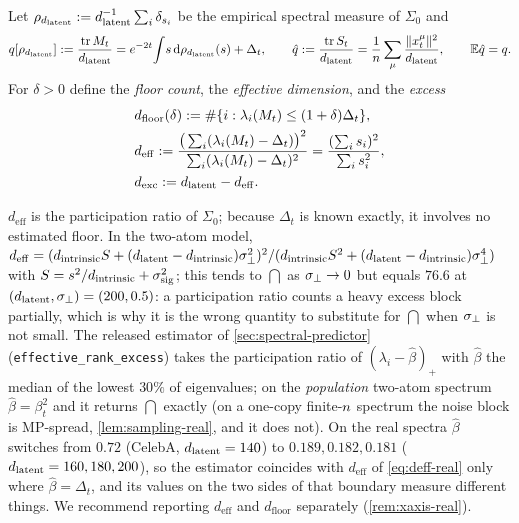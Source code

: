 \begin{definition}\label{def:deff-real}
Let $\rho_{d_{\mathrm{latent}}}:=d_{\mathrm{latent}}^{-1}\sum_i\delta_{s_i}$ be the empirical spectral measure of $\Sigma_0$ and
\begin{equation}\label{eq:q-real}
q[\rho_{d_{\mathrm{latent}}}]:=\frac{\operatorname{tr}M_t}{d_{\mathrm{latent}}}=e^{-2t}\!\int\! s\,\mathrm d\rho_{d_{\mathrm{latent}}}(s)+\Delta_t,\qquad \hat q:=\frac{\operatorname{tr}S_t}{d_{\mathrm{latent}}}=\frac1{n}\sum_\mu\frac{\|x_t^\mu\|^2}{d_{\mathrm{latent}}},\qquad \mathbb{E}\hat q=q .
\end{equation}
For $\delta>0$ define the \emph{floor count}, the \emph{effective dimension}, and the \emph{excess}
\begin{equation}\label{eq:deff-real}
\begin{aligned}
&d_{\mathrm{floor}}(\delta):=\#\{i:\lambda_i(M_t)\le(1+\delta)\Delta_t\},\\ &
d_{\mathrm{eff}}:=\frac{\big(\sum_i(\lambda_i(M_t)-\Delta_t)\big)^2}{\sum_i(\lambda_i(M_t)-\Delta_t)^2}=\frac{(\sum_is_i)^2}{\sum_is_i^2},\\ &
d_{\mathrm{exc}}:=d_{\mathrm{latent}}-d_{\mathrm{eff}} .
\end{aligned}
\end{equation}
\end{definition}
$d_{\mathrm{eff}}$ is the participation ratio of $\Sigma_0$; because $\Delta_t$ is known exactly, it involves no estimated floor. In the two-atom model, $d_{\mathrm{eff}}=(d_{\mathrm{intrinsic}} S+(d_{\mathrm{latent}}-d_{\mathrm{intrinsic}})\sigma_{\perp}^2)^2/(d_{\mathrm{intrinsic}} S^2+(d_{\mathrm{latent}}-d_{\mathrm{intrinsic}})\sigma_{\perp}^4)$ with $S=s^2/d_{\mathrm{intrinsic}}+\sigma_{\mathrm{sig}}^2$; this tends to $\dint$ as $\sigma_{\perp}\to0$ but equals $76.6$ at $(d_{\mathrm{latent}},\sigma_{\perp})=(200,0.5)$: a participation ratio counts a heavy excess block partially, which is why it is the wrong quantity to substitute for $\dint$ when $\sigma_{\perp}$ is not small. The released estimator of \cref{sec:spectral-predictor} (\texttt{effective\_rank\_excess}) takes the participation ratio of $(\lambda_i-\hat\beta)_+$ with $\hat\beta$ the median of the lowest $30\%$ of eigenvalues; on the \emph{population} two-atom spectrum $\hat\beta=\beta_t^2$ and it returns $\dint$ exactly (on a one-copy finite-$n$ spectrum the noise block is MP-spread, \cref{lem:sampling-real}, and it does not). On the real spectra $\hat\beta$ switches from $0.72$ (CelebA, $d_{\mathrm{latent}}=140$) to $0.189,0.182,0.181$ ($d_{\mathrm{latent}}=160,180,200$), so the estimator coincides with $d_{\mathrm{eff}}$ of \eqref{eq:deff-real} only where $\hat\beta=\Delta_t$, and its values on the two sides of that boundary measure different things. We recommend reporting $d_{\mathrm{eff}}$ and $d_{\mathrm{floor}}$ separately (\cref{rem:xaxis-real}).

